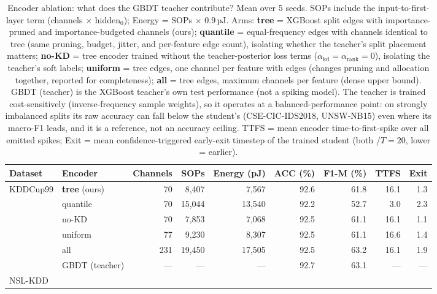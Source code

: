 \begin{table}[!ht]
\centering
\renewcommand{\arraystretch}{1.05}
\caption{Encoder ablation: what does the GBDT teacher contribute? Mean over 5 seeds. SOPs include the input-to-first-layer term (channels $\times$ hidden$_0$); Energy = SOPs $\times$ 0.9\,pJ. Arms: \textbf{tree} = XGBoost split edges with importance-pruned and importance-budgeted channels (ours); \textbf{quantile} = equal-frequency edges with channels identical to tree (same pruning, budget, jitter, and per-feature edge count), isolating whether the teacher's split placement matters; \textbf{no-KD} = tree encoder trained without the teacher-posterior loss terms ($\alpha_{\mathrm{kd}} = \alpha_{\mathrm{rank}} = 0$), isolating the teacher's soft labels; \textbf{uniform} = tree edges, one channel per feature with edges (changes pruning and allocation together, reported for completeness); \textbf{all} = tree edges, maximum channels per feature (dense upper bound). GBDT (teacher) is the XGBoost teacher's own test performance (not a spiking model). The teacher is trained cost-sensitively (inverse-frequency sample weights), so it operates at a balanced-performance point: on strongly imbalanced splits its raw accuracy can fall below the student's (CSE-CIC-IDS2018, UNSW-NB15) even where its macro-F1 leads, and it is a reference, not an accuracy ceiling. TTFS = mean encoder time-to-first-spike over all emitted spikes; Exit = mean confidence-triggered early-exit timestep of the trained student (both /$T{=}20$, lower = earlier).}
\label{tab:encoder_ablation}
{\scriptsize
\begin{tabular}{l l r r r r r r r}
\toprule
\textbf{Dataset} & \textbf{Encoder} & \textbf{Channels} & \textbf{SOPs} & \textbf{Energy (pJ)} & \textbf{ACC (\%)} & \textbf{F1-M (\%)} & \textbf{TTFS} & \textbf{Exit} \\
\midrule
\multirow{6}{*}{KDDCup99}
& \textbf{tree} (ours) & 70 & 8,407 & 7,567 & 92.6 & 61.8 & 16.1 & 1.3 \\
& quantile & 70 & 15,044 & 13,540 & 92.2 & 52.7 & 3.0 & 2.3 \\
& no-KD & 70 & 7,853 & 7,068 & 92.5 & 61.1 & 16.1 & 1.1 \\
& uniform & 77 & 9,230 & 8,307 & 92.5 & 61.1 & 16.6 & 1.4 \\
& all & 231 & 19,450 & 17,505 & 92.5 & 63.2 & 16.1 & 1.9 \\
& GBDT (teacher) & --- & --- & --- & 92.7 & 63.1 & --- & --- \\
\midrule
\multirow{6}{*}{NSL-KDD}

\end{tabular}}
\end{table}
